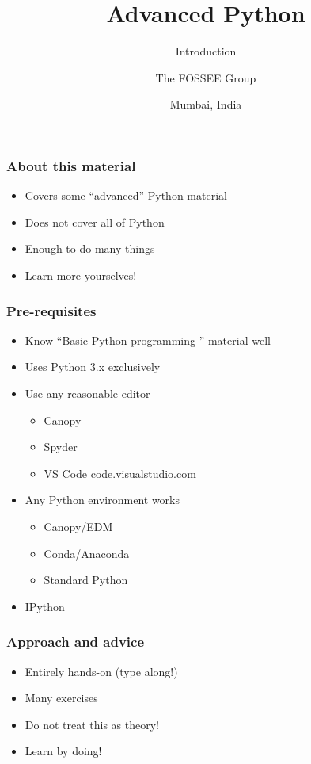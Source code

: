 \documentclass[14pt,compress]{beamer}
\title[Introduction]{Advanced Python}
\subtitle{Introduction}
\author[FOSSEE] {The FOSSEE Group}
\institute[IIT Bombay] {Department of Aerospace Engineering\\IIT Bombay}
\date[] {Mumbai, India}
\begin{document}
\begin{frame}
  \titlepage
\end{frame}

\begin{frame}
  \frametitle{About this material}
  \begin{itemize}
  \item Covers some ``advanced'' Python material
  \item Does not cover all of Python
  \item Enough to do many things
    \vspace*{0.5in}
  \item Learn more yourselves!
  \end{itemize}
\end{frame}

\begin{frame}
  \frametitle{Pre-requisites}
  \begin{itemize}
  \item Know ``Basic Python programming '' material well
  \item Uses Python 3.x exclusively
  \item Use any reasonable editor
    \begin{itemize}
    \item Canopy
    \item Spyder
    \item VS Code \url{code.visualstudio.com}
    \end{itemize}
  \item Any Python environment works
    \begin{itemize}
    \item Canopy/EDM
    \item Conda/Anaconda
    \item Standard Python
    \end{itemize}
  \item IPython
  \end{itemize}
\end{frame}

\begin{frame}
  \frametitle{Approach and advice}
  \begin{itemize}
  \item Entirely hands-on (type along!)
  \item Many exercises
  \item Do not treat this as theory!
  \item \alert{Learn by doing!}
  \end{itemize}
\end{frame}
\end{document}
